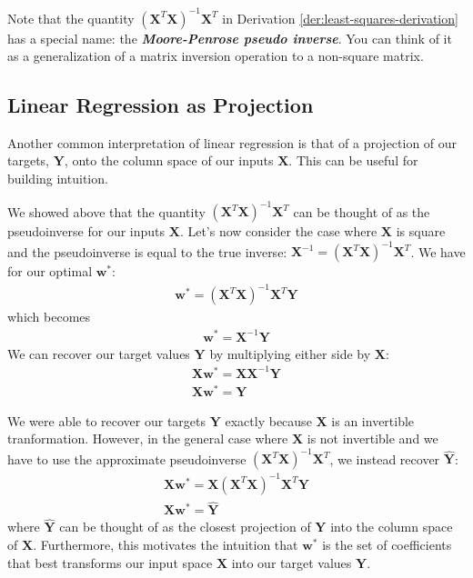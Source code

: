 Note that the quantity $(\textbf{X}^{T}\textbf{X})^{-1}\textbf{X}^{T}$ in Derivation \ref{der:least-squares-derivation} has a special name: the \textbf{\textit{Moore-Penrose pseudo inverse}}. You can think of it as a generalization of a matrix inversion operation to a non-square matrix.

\subsection{Linear Regression as Projection}
Another common interpretation of linear regression is that of a projection of our targets, $\textbf{Y}$, onto the column space of our inputs $\textbf{X}$. This can be useful for building intuition.

We showed above that the quantity $(\textbf{X}^{T}\textbf{X})^{-1}\textbf{X}^{T}$ can be thought of as the pseudoinverse for our inputs $\textbf{X}$. Let's now consider the case where $\textbf{X}$ is square and the pseudoinverse is equal to the true inverse: $\textbf{X}^{-1} = (\textbf{X}^{T}\textbf{X})^{-1}\textbf{X}^{T}$. We have for our optimal $\textbf{w}^{*}$:
\begin{align*}
    \textbf{w}^{*} = (\textbf{X}^{T}\textbf{X})^{-1}\textbf{X}^{T}\textbf{Y}
\end{align*}
which becomes
\begin{align*}
    \textbf{w}^{*} = \textbf{X}^{-1}\textbf{Y}
\end{align*}
We can recover our target values $\textbf{Y}$ by multiplying either side by $\textbf{X}$:
\begin{align*}
    \textbf{X}\textbf{w}^{*} = \textbf{X}\textbf{X}^{-1}\textbf{Y} \\
    \textbf{X}\textbf{w}^{*} = \textbf{Y}
\end{align*}

We were able to recover our targets $\textbf{Y}$ exactly because $\textbf{X}$ is an invertible tranformation. However, in the general case where $\textbf{X}$ is not invertible and we have to use the approximate pseudoinverse $(\textbf{X}^{T}\textbf{X})^{-1}\textbf{X}^{T}$, we instead recover $\hat{\textbf{Y}}$:
\begin{align*}
    \textbf{X}\textbf{w}^{*} = \textbf{X}(\textbf{X}^{T}\textbf{X})^{-1}\textbf{X}^{T}\textbf{Y} \\
    \textbf{X}\textbf{w}^{*} = \hat{\textbf{Y}}
\end{align*}
where $\hat{\textbf{Y}}$ can be thought of as the closest projection of $\textbf{Y}$ into the column space of $\textbf{X}$. Furthermore, this motivates the intuition that $\textbf{w}^{*}$ is the set of coefficients that best transforms our input space $\textbf{X}$ into our target values $\textbf{Y}$.

